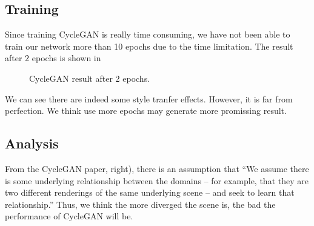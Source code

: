 \documentclass[runningheads]{llncs}
\begin{document}
\subsection{Training}
Since training CycleGAN is really time consuming, we have not been able to train our network more than 10 epochs due to the time limitation. The result after $2$ epochs is shown in 
\begin{figure}[ht]
	\centering
	\setlength{\fboxrule}{0.0pt}
	\caption{CycleGAN result after 2 epochs.}
	\label{fig7}
\end{figure}
We can see there are indeed some style tranfer effects. However, it is far from perfection. We think use more epochs may generate more promissing result.

\subsection{Analysis}
From the CycleGAN paper, right), there is an assumption that ``We assume there is some underlying relationship between the domains – for example, that they are two different renderings of the same underlying scene – and seek to learn that relationship.'' Thus, we think the more diverged the scene is, the bad the performance of CycleGAN will be.
\end{document}
